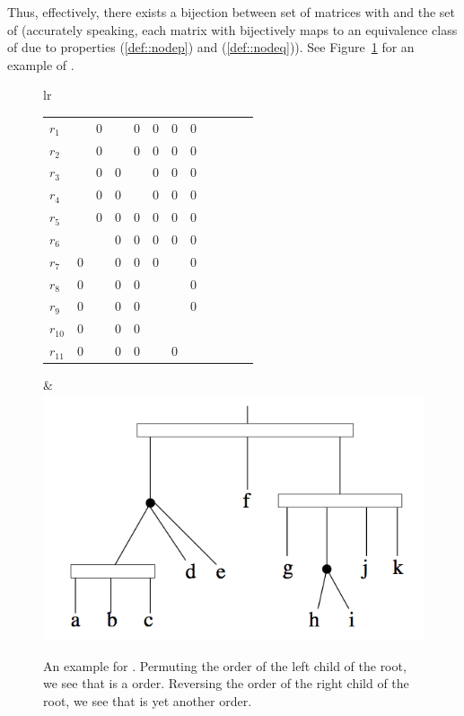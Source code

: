 Thus, effectively, there exists a bijection between set of matrices
with \COP and the set of \PQtrees (accurately speaking, each matrix
with \COP bijectively maps to an equivalence class of \PQtrees due to
properties (\ref{def::nodep}) and (\ref{def::nodeq})). See
Figure~\ref{fig:pqtree} for an example of \PQtree.

\begin{figure}[htbp]
  \centering
  \begin{tabular}[h]{lr}
    \begin{tabular}[h]
      {>{\columncolor{\tblhcolor}} l lllllllllll|}
      \hline
      $r_1$   &\un &0   &\un &0   &0   &0    &0   \\
      $r_2$   &\un &0   &\un &0   &0   &0    &0   \\
      $r_3$   &\un &0   &0   &\un &0   &0    &0   \\
      $r_4$   &\un &0   &0   &\un &0   &0    &0   \\
      $r_5$   &\un &0   &0   &0   &0   &0    &0   \\
      $r_6$   &\un &\un &0   &0   &0   &0    &0   \\
      $r_7$   &0   &\un &0   &0   &0   &\un  &0   \\
      $r_8$   &0   &\un &0   &0   &\un &\un  &0   \\
      $r_9$   &0   &\un &0   &0   &\un &\un  &0   \\
      $r_{10}$ &0   &\un &0   &0   &\un &\un  &\un \\
      $r_{11}$ &0   &\un &0   &0   &\un &0    &\un \\
      \hline
    \end{tabular}
    &
    \includegraphics[scale=0.3]{../img/pqtree.png}
    
  \end{tabular}
 
  \caption[\figtabsize An example for \PQtree]{\figtabsize An example for \PQtree.
    Permuting the order of the left child of the root, we see that
     is a \COP order. Reversing the
    order of the right child of the root, we see that
     is yet another \COP order. 
    \cite[Fig.~1]{mcc04}}
  \label{fig:pqtree}
\end{figure}

